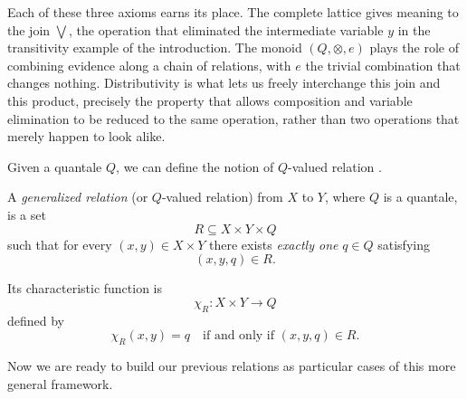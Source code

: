 Each of these three axioms earns its place. The complete lattice gives
meaning to the join $\bigvee$, the operation that eliminated the
intermediate variable $y$ in the transitivity example of the introduction.
The monoid $(Q,\otimes,e)$ plays the role of combining evidence along a
chain of relations, with $e$ the trivial combination that changes nothing.
Distributivity is what lets us freely interchange this join and this
product, precisely the property that allows composition and variable
elimination to be reduced to the same operation, rather than two operations
that merely happen to look alike.

Given a quantale $Q$, we can define the notion of $Q$-valued relation \cite{coecke2018generalizedrelations}.

\begin{definition}
	A \emph{generalized relation} (or $Q$-valued relation) from $X$ to $Y$, where $Q$ is a quantale, is a set
	\[
		R \subseteq X \times Y \times Q
	\]
	such that for every $(x,y) \in X \times Y$ there exists \emph{exactly one}
	$q \in Q$ satisfying
	\[
		(x,y,q) \in R.
	\]

	Its characteristic function is
	\[
		\chi_R: X \times Y \to Q
	\]
	defined by
	\[
		\chi_R(x,y) = q
		\quad \text{if and only if } (x,y,q) \in R.
	\]
\end{definition}

Now we are ready to build our previous relations as particular cases of this more general framework.

